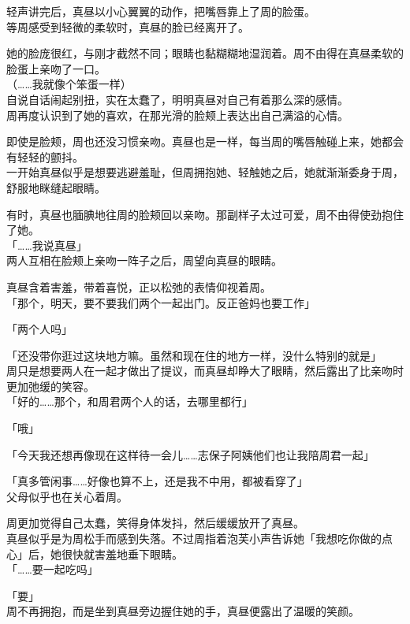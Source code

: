 轻声讲完后，真昼以小心翼翼的动作，把嘴唇靠上了周的脸蛋。\\

等周感受到轻微的柔软时，真昼的脸已经离开了。

她的脸庞很红，与刚才截然不同；眼睛也黏糊糊地湿润着。周不由得在真昼柔软的脸蛋上亲吻了一口。\\

（……我就像个笨蛋一样）\\

自说自话闹起别扭，实在太蠢了，明明真昼对自己有着那么深的感情。\\

周再度认识到了她的喜欢，在那光滑的脸颊上表达出自己满溢的心情。

即使是脸颊，周也还没习惯亲吻。真昼也是一样，每当周的嘴唇触碰上来，她都会有轻轻的颤抖。\\

一开始真昼似乎是想要逃避羞耻，但周拥抱她、轻触她之后，她就渐渐委身于周，舒服地眯缝起眼睛。

有时，真昼也腼腆地往周的脸颊回以亲吻。那副样子太过可爱，周不由得使劲抱住了她。\\

「……我说真昼」\\

两人互相在脸颊上亲吻一阵子之后，周望向真昼的眼睛。

真昼含着害羞，带着喜悦，正以松弛的表情仰视着周。\\

「那个，明天，要不要我们两个一起出门。反正爸妈也要工作」

「两个人吗」

「还没带你逛过这块地方嘛。虽然和现在住的地方一样，没什么特别的就是」\\

周只是想要两人在一起才做出了提议，而真昼却睁大了眼睛，然后露出了比亲吻时更加弛缓的笑容。\\

「好的……那个，和周君两个人的话，去哪里都行」

「哦」

「今天我还想再像现在这样待一会儿……志保子阿姨他们也让我陪周君一起」

「真多管闲事……好像也算不上，还是我不中用，都被看穿了」\\

父母似乎也在关心着周。

周更加觉得自己太蠢，笑得身体发抖，然后缓缓放开了真昼。\\

真昼似乎是为周松手而感到失落。不过周指着泡芙小声告诉她「我想吃你做的点心」后，她很快就害羞地垂下眼睛。\\

「……要一起吃吗」

「要」\\

周不再拥抱，而是坐到真昼旁边握住她的手，真昼便露出了温暖的笑颜。
